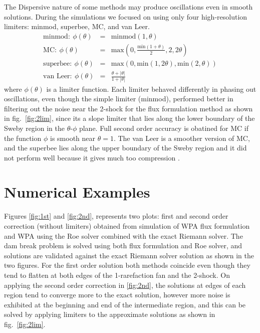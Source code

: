 \documentclass[12pt,a4paper]{article}
\begin{document}
	  The Dispersive nature of some methods may produce oscillations even in smooth solutions. During the simulations we focused on using only  four high-resolution limiters: minmod, superbee, MC, and van Leer.
	\begin{eqnarray}
		\text{minmod} :~ \phi(\theta) &=& \text{minmod}(1,\theta)\\
		\text{MC} : ~ \phi(\theta) &=& \text{max} \left(0,\frac{\text{min}(1 + \theta)}{2},2,2\theta \right)\\
		\text{superbee}: ~ \phi(\theta) &=& \text{max}(0,\text{min}(1,2\theta),\text{min}(2,\theta))\\
		\text{van Leer} : ~ \phi(\theta) &=& \frac{\theta + |\theta|}{1 + |\theta|}
	\end{eqnarray}
	  where $\phi(\theta)$ is a limiter function. Each limiter behaved differently in phasing out oscillations, even though the simple limiter (minmod), performed better  in filtering out the noise near the 2-shock for the flux formulation method as shown in fig.~\ref*{fig:2lim}, since its a slope limiter that lies along the lower boundary of the Sweby region in the $\theta$-$\phi$  plane. Full second order accuracy is obatined for MC if the function $\phi$ is smooth near $\theta=1$. The van Leer is a smoother version of MC, and the superbee lies along the upper boundary of the Sweby region and it did not perform well because it gives much too compression  \cite{ma-ah-be-ca-ge-ha-ke-le-le:2016}.\\
	\section{Numerical Examples}
	
	Figures \ref{fig:1st} and  \ref{fig:2nd}, represents two plots: first  and second order correction (without limiters) obtained from simulation of WPA flux formulation and WPA using the Roe solver combined with the exact Riemann solver. The dam break problem is solved using both flux formulation and  Roe solver, and  solutions are validated against the exact Riemann solver solution as shown in the two figures. For the first order solution both methods coincide even though they tend to flatten at both edges of the 1-rarefaction fan and the 2-shock. On applying the second order correction in  \ref{fig:2nd}, the solutions at edges of each region tend to converge more to the exact solution, however more noise is exhibited at the beginning and end of the intermediate region, and this can be solved by applying limiters to the approximate solutions as shown in fig.~\ref{fig:2lim}. \\
	
\end{document}
